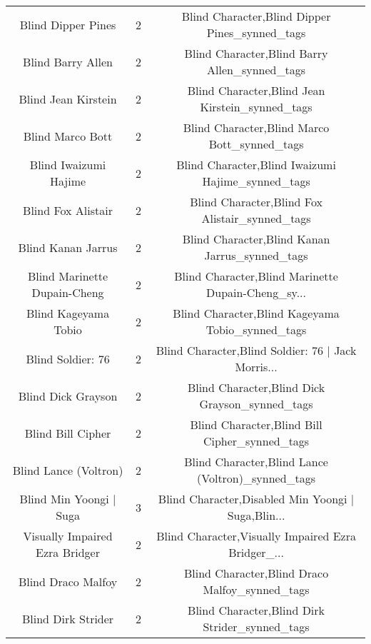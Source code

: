 \begin{table}[h!]
{\begin{tabular}{|c|c|c|}
                                Blind Dipper Pines &          2 &     Blind Character,Blind Dipper Pines\_synned\_tags \\
                                 Blind Barry Allen &          2 &      Blind Character,Blind Barry Allen\_synned\_tags \\
                               Blind Jean Kirstein &          2 &    Blind Character,Blind Jean Kirstein\_synned\_tags \\
                                  Blind Marco Bott &          2 &       Blind Character,Blind Marco Bott\_synned\_tags \\
                             Blind Iwaizumi Hajime &          2 &  Blind Character,Blind Iwaizumi Hajime\_synned\_tags \\
                                Blind Fox Alistair &          2 &     Blind Character,Blind Fox Alistair\_synned\_tags \\
                                Blind Kanan Jarrus &          2 &     Blind Character,Blind Kanan Jarrus\_synned\_tags \\
                      Blind Marinette Dupain-Cheng &          2 & Blind Character,Blind Marinette Dupain-Cheng\_sy... \\
                              Blind Kageyama Tobio &          2 &   Blind Character,Blind Kageyama Tobio\_synned\_tags \\
                                 Blind Soldier: 76 &          2 & Blind Character,Blind Soldier: 76 | Jack Morris... \\
                                Blind Dick Grayson &          2 &     Blind Character,Blind Dick Grayson\_synned\_tags \\
                                 Blind Bill Cipher &          2 &      Blind Character,Blind Bill Cipher\_synned\_tags \\
                             Blind Lance (Voltron) &          2 &  Blind Character,Blind Lance (Voltron)\_synned\_tags \\
                           Blind Min Yoongi | Suga &          3 & Blind Character,Disabled Min Yoongi | Suga,Blin... \\
                    Visually Impaired Ezra Bridger &          2 & Blind Character,Visually Impaired Ezra Bridger\_... \\
                                Blind Draco Malfoy &          2 &     Blind Character,Blind Draco Malfoy\_synned\_tags \\
                                Blind Dirk Strider &          2 &     Blind Character,Blind Dirk Strider\_synned\_tags \\

\end{tabular}}
\end{table}
